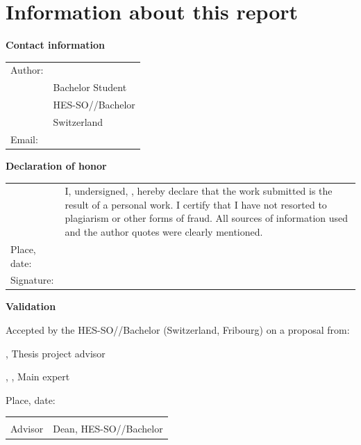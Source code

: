 \chapter*{Information about this report}

\vspace{\fill}

\textbf{Contact information}

\begin{tabularx}{\textwidth}{R{2.5cm}X}
	Author:	 & \AuthorFirstName \AuthorLastName \\
	& Bachelor Student \\
	& HES-SO//Bachelor \\
	& Switzerland \\
	Email: & \email{\AuthorEmail}
\end{tabularx}

\vspace{\fill}

\textbf{Declaration of honor}

{\renewcommand{\arraystretch}{2}
\begin{tabularx}{\textwidth}{R{2.5cm}X}
	& I, undersigned, \Author, hereby declare that the work submitted is 
	the result of a personal work. I certify that I have not resorted to 
	plagiarism or other forms of fraud. All sources of information used and the 
	author quotes were clearly mentioned. \\
	Place, date: & \underline{\hspace{7cm}} \\ 
	Signature: & \underline{\hspace{7cm}}
\end{tabularx}
}

\vspace{\fill}

\textbf{Validation}

Accepted by the HES-SO//Bachelor (Switzerland, Fribourg) on a proposal from:

\vspace{0.5cm}

\Advisor, Thesis project advisor

\Expert, \ExpertLab, Main expert

\vspace{1cm}

Place, date: \underline{\hspace{8cm}}

\vspace{3cm}

{ \renewcommand{\arraystretch}{1.5}
\begin{tabularx}{\textwidth}{X X}
	\Advisor  & \Dean\\ 
	Advisor   & Dean, HES-SO//Bachelor\\
\end{tabularx}
}